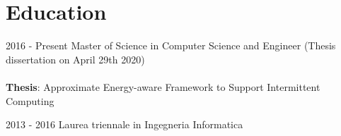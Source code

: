 \documentclass[letterpaper]{twentysecondcv} %
\begin{document}
\makeprofile %

\section{Education}
\begin{twenty}
	\twentyitem
	{2016 -}
	{Present}
	{Master of Science in Computer Science and Engineer}
	{}
	{
	(Thesis dissertation on April 29th 2020)\\ \\
	{
	\textbf{Thesis}: Approximate Energy-aware Framework to Support Intermittent Computing
	}
	}
	{\footnotesize{}}

	\twentyitem
	{2013 - 2016}
	{}
	{Laurea triennale in Ingegneria Informatica}
	{}
	{}
	{\footnotesize{}}
\end{twenty}


\end{document}
